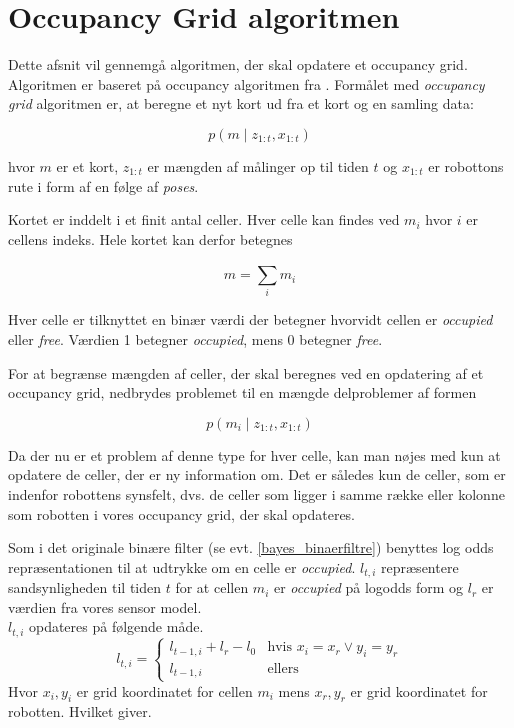 \section{Occupancy Grid algoritmen}
Dette afsnit vil gennemgå algoritmen, der skal opdatere et occupancy grid.
Algoritmen er baseret på occupancy algoritmen fra \cite[p. 286]{probabilisticRobotics}.
Formålet med \textit{occupancy grid} algoritmen er, at beregne	et nyt kort ud fra et kort og en samling data:

\begin{equation}
p(m \mid z_{1:t}, x_{1:t})
\end{equation}

hvor $m$ er et kort, $ z_{1:t} $ er mængden af målinger op til tiden $t$ og $ x_{1:t} $ er robottons rute i form af en følge af \textit{poses}.

Kortet er inddelt i et finit antal celler.
Hver celle kan findes ved $ m_i $ hvor $i$ er cellens indeks. 
Hele kortet kan derfor betegnes

\begin{equation}
m = \sum_{i}^{} m_i 
\end{equation}

Hver celle er tilknyttet en binær værdi der betegner hvorvidt cellen er \textit{occupied} eller \textit{free}.
Værdien 1 betegner \textit{occupied}, mens 0 betegner \textit{free}.

For at begrænse mængden af celler, der skal beregnes ved en opdatering af et occupancy grid, nedbrydes problemet til en mængde delproblemer af formen

\begin{equation}
p(m_i \mid z_{1:t}, x_{1:t})
\end{equation} 

Da der nu er et problem af denne type for hver celle, kan man nøjes med kun at opdatere de celler, der er ny information om. 
Det er således kun de celler, som er indenfor robottens synsfelt, dvs. de celler som ligger i samme række eller kolonne som robotten i vores occupancy grid, der skal opdateres.


Som i det originale binære filter (se evt. \cref{bayes_binaerfiltre}) benyttes log odds repræsentationen til at udtrykke om en celle er \textit{occupied}.
$l_{t,i}$ repræsentere sandsynligheden til tiden $t$ for at cellen $m_i$ er \textit{occupied} på logodds form og $l_r$ er værdien fra vores sensor model. \\

$l_{t,i}$ opdateres på følgende måde.
\begin{equation}
	l_{t,i} = \begin{cases}
		l_{t-1,i} + l_r - l_0 &\text{hvis } x_i = x_r \vee y_i = y_r \\
		l_{t-1,i} &\text{ellers}
	\end{cases}
\end{equation}
Hvor $x_i, y_i$ er grid koordinatet for cellen $m_i$ mens $x_r, y_r$ er grid koordinatet for robotten. Hvilket giver.


